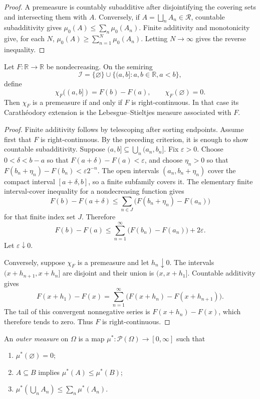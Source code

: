\begin{proof}
A premeasure is countably subadditive after disjointifying the covering sets
and intersecting them with $A$. Conversely, if
$A=\bigsqcup_nA_n\in\mathcal R$, countable subadditivity gives
$\mu_0(A)\leq\sum_n\mu_0(A_n)$. Finite additivity and monotonicity give, for
each $N$,
$\mu_0(A)\geq\sum_{n=1}^{N}\mu_0(A_n)$. Letting $N\to\infty$ gives the
reverse inequality.
\end{proof}

\begin{thm}
Let $F:\mathbb R\to\mathbb R$ be nondecreasing. On the semiring
\[
\mathcal I=\{\varnothing\}\cup\{(a,b]:a,b\in\mathbb R,
 a<b\},
\]
define
\[
\chi_F((a,b])=F(b)-F(a),\qquad \chi_F(\varnothing)=0.
\]
Then $\chi_F$ is a premeasure if and only if $F$ is right-continuous. In that
case its Carath\'eodory extension is the Lebesgue--Stieltjes measure associated
with $F$.
\end{thm}

\begin{proof}
Finite additivity follows by telescoping after sorting endpoints. Assume first
that $F$ is right-continuous. By the preceding criterion, it is enough to
show countable subadditivity. Suppose
$(a,b]\subseteq\bigcup_n(a_n,b_n]$. Fix $\varepsilon>0$. Choose
$0<\delta<b-a$ so that
$F(a+\delta)-F(a)<\varepsilon$, and choose $\eta_n>0$ so that
$F(b_n+\eta_n)-F(b_n)<\varepsilon2^{-n}$. The open intervals
$(a_n,b_n+\eta_n)$ cover the compact interval $[a+\delta,b]$, so a finite
subfamily covers it. The elementary finite interval-cover inequality for a
nondecreasing function gives
\[
F(b)-F(a+\delta)
 \leq\sum_{n\in J}\bigl(F(b_n+\eta_n)-F(a_n)\bigr)
\]
for that finite index set $J$. Therefore
\[
F(b)-F(a)
 \leq\sum_{n=1}^{\infty}\bigl(F(b_n)-F(a_n)\bigr)+2\varepsilon.
\]
Let $\varepsilon\downarrow0$.

Conversely, suppose $\chi_F$ is a premeasure and let $h_n\downarrow0$.
The intervals $(x+h_{n+1},x+h_n]$ are disjoint and their union is
$(x,x+h_1]$. Countable additivity gives
\[
F(x+h_1)-F(x)
 =\sum_{n=1}^{\infty}
   \bigl(F(x+h_n)-F(x+h_{n+1})\bigr).
\]
The tail of this convergent nonnegative series is
$F(x+h_n)-F(x)$, which therefore tends to zero. Thus $F$ is
right-continuous.
\end{proof}

\begin{de}
An \emph{outer measure} on $\Omega$ is a map
$\mu^*:\mathcal P(\Omega)\to[0,\infty]$ such that
\begin{enumerate}[label=(\roman*)]
  \item $\mu^*(\varnothing)=0$;
  \item $A\subseteq B$ implies $\mu^*(A)\leq\mu^*(B)$;
  \item $\mu^*(\bigcup_nA_n)\leq\sum_n\mu^*(A_n)$.
\end{enumerate}
\end{de}

